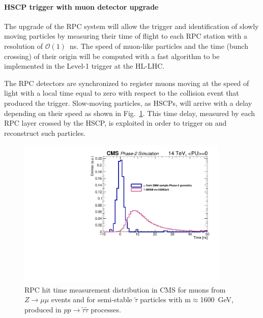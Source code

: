 \paragraph{HSCP trigger with muon detector upgrade}

The upgrade of the RPC system will allow the trigger and identification of slowly moving particles by measuring their time of flight to each RPC station with a resolution of $\mathcal{O}(1)$~ns. The speed of muon-like particles and the time (bunch crossing) of their origin will be computed with a fast algorithm to be implemented in the Level-1 trigger at the HL-LHC.

The RPC detectors are synchronized to register muons moving at the speed of light with a local time equal to zero with respect to the collision event that produced the trigger. Slow-moving particles, as HSCPs, will arrive with a delay depending on their speed as shown in Fig.~\ref{fig:hscp_time}. This time delay, measured by each RPC layer crossed by the HSCP, is exploited in order to trigger on and reconstruct such particles.

\begin{figure}[t]
\begin{center}
  \includegraphics[width=0.9\textwidth]{figures/HSCP/time.pdf}
  \caption{RPC hit time measurement distribution in CMS for muons from $Z \to \mu\mu$ events and for semi-stable $\tilde \tau$ particles with m$\approx$1600~GeV, produced in $pp \to \tilde \tau \tilde \tau$ processes.}
  \label{fig:hscp_time}
\end{center}
\end{figure}

